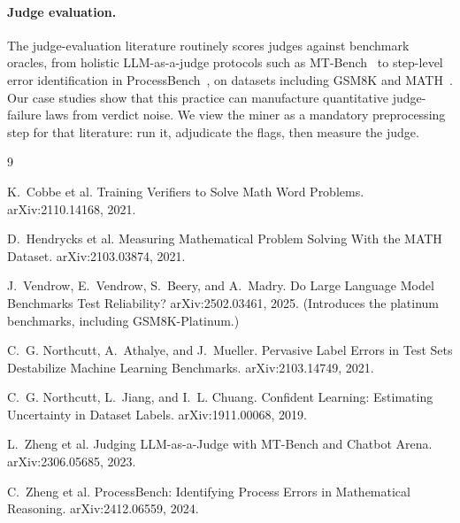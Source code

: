 \documentclass[11pt]{article}
\begin{document}
\paragraph{Judge evaluation.}
The judge-evaluation literature routinely scores judges against benchmark oracles, from holistic LLM-as-a-judge protocols such as MT-Bench~\cite{mtbench} to step-level error identification in ProcessBench~\cite{processbench}, on datasets including GSM8K and MATH~\cite{gsm8k,math}.
Our case studies show that this practice can manufacture quantitative judge-failure laws from verdict noise.
We view the miner as a mandatory preprocessing step for that literature: run it, adjudicate the flags, then measure the judge.

\begin{thebibliography}{9}

K.~Cobbe et al.
Training Verifiers to Solve Math Word Problems.
arXiv:2110.14168, 2021.

D.~Hendrycks et al.
Measuring Mathematical Problem Solving With the MATH Dataset.
arXiv:2103.03874, 2021.

J.~Vendrow, E.~Vendrow, S.~Beery, and A.~Madry.
Do Large Language Model Benchmarks Test Reliability?
arXiv:2502.03461, 2025.
(Introduces the platinum benchmarks, including GSM8K-Platinum.)

C.~G. Northcutt, A.~Athalye, and J.~Mueller.
Pervasive Label Errors in Test Sets Destabilize Machine Learning Benchmarks.
arXiv:2103.14749, 2021.

C.~G. Northcutt, L.~Jiang, and I.~L. Chuang.
Confident Learning: Estimating Uncertainty in Dataset Labels.
arXiv:1911.00068, 2019.

L.~Zheng et al.
Judging LLM-as-a-Judge with MT-Bench and Chatbot Arena.
arXiv:2306.05685, 2023.

C.~Zheng et al.
ProcessBench: Identifying Process Errors in Mathematical Reasoning.
arXiv:2412.06559, 2024.

\end{thebibliography}
\end{document}
